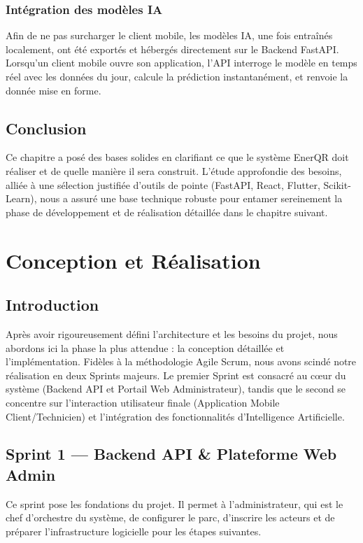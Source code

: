\documentclass[12pt,a4paper]{report}
\begin{document}
\subsection{Intégration des modèles IA}
Afin de ne pas surcharger le client mobile, les modèles IA, une fois entraînés localement, ont été exportés et hébergés directement sur le Backend FastAPI. Lorsqu'un client mobile ouvre son application, l'API interroge le modèle en temps réel avec les données du jour, calcule la prédiction instantanément, et renvoie la donnée mise en forme.

\section*{Conclusion}
Ce chapitre a posé des bases solides en clarifiant ce que le système EnerQR doit réaliser et de quelle manière il sera construit. L'étude approfondie des besoins, alliée à une sélection justifiée d'outils de pointe (FastAPI, React, Flutter, Scikit-Learn), nous a assuré une base technique robuste pour entamer sereinement la phase de développement et de réalisation détaillée dans le chapitre suivant.

\chapter{Conception et Réalisation}

\section*{Introduction}
Après avoir rigoureusement défini l'architecture et les besoins du projet, nous abordons ici la phase la plus attendue : la conception détaillée et l'implémentation. Fidèles à la méthodologie Agile Scrum, nous avons scindé notre réalisation en deux Sprints majeurs. Le premier Sprint est consacré au cœur du système (Backend API et Portail Web Administrateur), tandis que le second se concentre sur l'interaction utilisateur finale (Application Mobile Client/Technicien) et l'intégration des fonctionnalités d'Intelligence Artificielle.

\section{Sprint 1 — Backend API \& Plateforme Web Admin}
Ce sprint pose les fondations du projet. Il permet à l'administrateur, qui est le chef d'orchestre du système, de configurer le parc, d'inscrire les acteurs et de préparer l'infrastructure logicielle pour les étapes suivantes.
\end{document}
